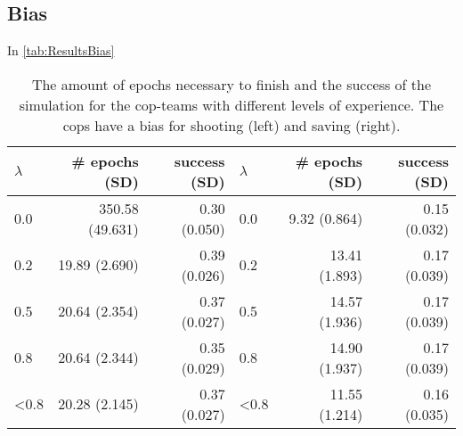 \subsection{Bias}
In \autoref{tab:ResultsBias}
\begin{table}[!ht]
\begin{center}
\begin{tabular}{l r  r | l r  r}
$\lambda$ &  \# epochs (SD) & success (SD) & $\lambda$ &  \# epochs (SD) & success (SD)\\
\hline
0.0 & 350.58 (49.631) & 0.30 (0.050) & 0.0 & 9.32 (0.864) & 0.15 (0.032)\\
0.2 & 19.89 (2.690) & 0.39 (0.026) & 0.2 & 13.41 (1.893) & 0.17 (0.039)\\
0.5 & 20.64 (2.354) & 0.37 (0.027) & 0.5 & 14.57 (1.936) & 0.17 (0.039)\\
0.8 & 20.64 (2.344) & 0.35 (0.029) & 0.8 & 14.90 (1.937) & 0.17 (0.039)\\
<0.8 & 20.28 (2.145) & 0.37 (0.027) & <0.8 & 11.55 (1.214) & 0.16 (0.035)\\
\hline
\end{tabular}
\caption{The amount of epochs necessary to finish and the success of the simulation for the cop-teams with different levels of experience. The cops have a bias for shooting (left) and saving (right).}
\label{tab:ResultsBias}
\end{center}
\end{table}
